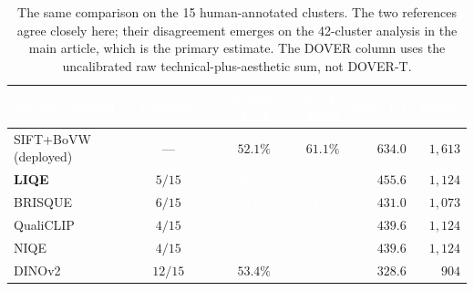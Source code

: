 \documentclass[sn-basic,Numbered]{sn-jnl}
\newcommand{\pfA}[1]{\cellcolor{perf5}\textcolor{white}{\textbf{#1}}}
\newcommand{\pfC}[1]{\cellcolor{perf3}#1}
\newcommand{\pfD}[1]{\cellcolor{perf2}#1}
\newcommand{\pfE}[1]{\cellcolor{perf1}\textcolor{white}{#1}}
\newcommand{\hd}[1]{\textcolor{white}{\textbf{#1}}}
\begin{document}
\begin{table}[!ht]
\centering
\caption{The same comparison on the 15 human-annotated clusters. The two
references agree closely here; their disagreement emerges on the 42-cluster
analysis in the main article, which is the primary estimate. The DOVER column
uses the uncalibrated raw technical-plus-aesthetic sum, not DOVER-T.}
\label{tab:e2e15}
\small
\setlength{\tabcolsep}{4.5pt}
\renewcommand{\arraystretch}{1.14}
\begin{tabular}{@{}l c r r r r@{}}
\toprule
\rowcolor{headerblue}
\hd{Scoring method} & \hd{Changed} & \hd{by raw T+A} & \hd{by Q-Align} &
\hd{Dur.\ (s)} & \hd{Words} \\
\midrule
\rowcolor{catbovw!12} SIFT+BoVW (deployed) & --- & \pfD{$52.1\%$} & \pfC{$61.1\%$} & $634.0$ & $1{,}613$ \\
\midrule
\rowcolor{perf5!16} \textbf{LIQE}  & $5/15$ & \pfA{$91.8\%$} & \pfA{$85.8\%$} & $455.6$ & $1{,}124$ \\
\rowcolor{rowwhite} BRISQUE        & $6/15$ & \pfA{$84.5\%$} & \pfA{$84.7\%$} & $431.0$ & $1{,}073$ \\
\rowcolor{rowlight} QualiCLIP      & $4/15$ & \pfA{$80.9\%$} & \pfA{$80.4\%$} & $439.6$ & $1{,}124$ \\
\rowcolor{rowwhite} NIQE           & $4/15$ & \pfA{$80.9\%$} & \pfA{$80.4\%$} & $439.6$ & $1{,}124$ \\
\midrule
\rowcolor{rowlight} DINOv2         & $12/15$ & \pfD{$53.4\%$} & \pfE{$36.7\%$} & $328.6$ & $\ \,904$ \\
\bottomrule
\end{tabular}
\end{table}
\end{document}
